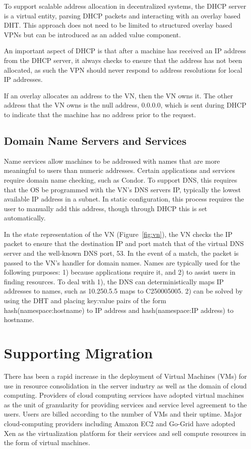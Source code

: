 To support scalable address allocation in decentralized systems, the
DHCP server is a virtual entity, parsing DHCP packets and interacting with
an overlay based DHT.  This approach does not need to be limited to structured
overlay based VPNs but can be introduced as an added value component.

An important aspect of DHCP is that after a machine has received an IP address
from the DHCP server, it always checks to ensure that the address has not been
allocated, as such the VPN should never respond to address resolutions for
local IP addresses.

If an overlay allocates an address to the VN, then the VN owns it.  The other
address that the VN owns is the null address, 0.0.0.0, which is sent during
DHCP to indicate that the machine has no address prior to the request.

\subsection{Domain Name Servers and Services}
Name services allow machines to be addressed with names that are more
meaningful to users than numeric addresses.  Certain applications and
services require domain name checking, such as Condor.  To support DNS, this
requires that the OS be programmed with the VN's DNS servers IP, typically
the lowest available IP address in a subnet.  In static configuration, this
process requires the user to manually add this address, though through DHCP
this is set automatically.

In the state representation of the VN (Figure~\ref{fig:vn}), the VN checks the
IP packet to ensure that the destination IP and port match that of the virtual
DNS server and the well-known DNS port, 53.  In the event of a match, the
packet is passed to the VN's handler for domain names.  Names are typically
used for the following purposes: 1) because applications require it, and 2) to
assist users in finding resources.  To deal with 1), the DNS can
deterministically maps IP addresses to names, such as 10.250.5.5 maps to
C250005005.  2) can be solved by using the DHT and placing key:value pairs of
the form hash(namespace:hostname) to IP address and hash(namespace:IP address)
to hostname.

\section{Supporting Migration}

There has been a rapid increase in the deployment of Virtual Machines (VMs) for
use in resource consolidation in the server industry as well as the domain of
cloud computing.  Providers of cloud computing services have adopted virtual
machines as the unit of granularity for providing services and service level
agreement to the users.  Users are billed according to the number of VMs and
their uptime. Major cloud-computing providers including Amazon EC2 and Go-Grid
have adopted Xen as the virtualization platform for their services and sell
compute resources in the form of virtual machines.


